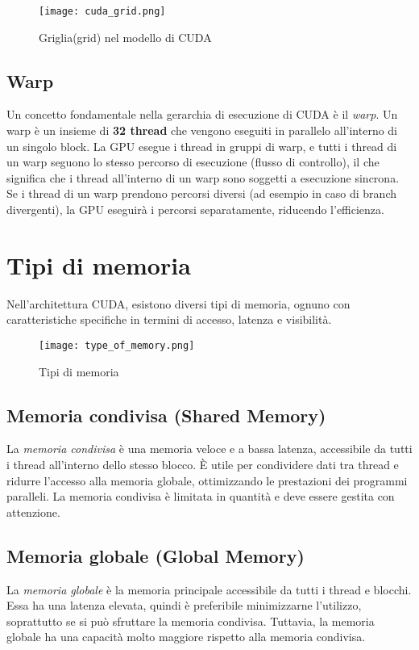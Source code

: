 \documentclass[12pt,a4paper]{report}
\begin{document}
\begin{figure}[h]
    \centering
    \texttt{[image: cuda\_grid.png]}
    \caption{Griglia(grid) nel modello di CUDA \cite{CUDA_blog}}
\end{figure}



\subsection*{Warp}
Un concetto fondamentale nella gerarchia di esecuzione di CUDA è il \textit{warp}. Un warp è un insieme di \textbf{32 thread} che vengono eseguiti in parallelo all'interno di un singolo block. La GPU esegue i thread in gruppi di warp, e tutti i thread di un warp seguono lo stesso percorso di esecuzione (flusso di controllo), il che significa che i thread all'interno di un warp sono soggetti a esecuzione sincrona. Se i thread di un warp prendono percorsi diversi (ad esempio in caso di branch divergenti), la GPU eseguirà i percorsi separatamente, riducendo l'efficienza.



\section{Tipi di memoria}

Nell'architettura CUDA, esistono diversi tipi di memoria, ognuno con caratteristiche specifiche in termini di accesso, latenza e visibilità.


\begin{figure}[h]
    \centering
    \texttt{[image: type\_of\_memory.png]}
    \caption{Tipi di memoria \cite{CUDAtutorial}}
\end{figure}


\subsection{Memoria condivisa (Shared Memory)}
La \textit{memoria condivisa} è una memoria veloce e a bassa latenza, accessibile da tutti i thread all'interno dello stesso blocco. È utile per condividere dati tra thread e ridurre l'accesso alla memoria globale, ottimizzando le prestazioni dei programmi paralleli. La memoria condivisa è limitata in quantità e deve essere gestita con attenzione.

\subsection{Memoria globale (Global Memory)}
La \textit{memoria globale} è la memoria principale accessibile da tutti i thread e blocchi. Essa ha una latenza elevata, quindi è preferibile minimizzarne l'utilizzo, soprattutto se si può sfruttare la memoria condivisa. Tuttavia, la memoria globale ha una capacità molto maggiore rispetto alla memoria condivisa.
\end{document}
